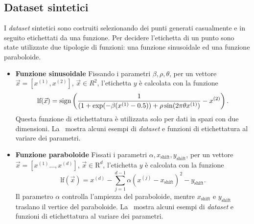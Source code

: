 \subsection{Dataset sintetici}
I \emph{dataset} sintetici sono costruiti selezionando dei punti generati casualmente e in seguito etichettati da una funzione.
Per decidere l'etichetta di un punto sono state utilizzate due tipologie di funzioni: una funzione sinusoidale ed una funzione paraboloide.
\begin{itemize}
    \item \textbf{Funzione sinusoidale} Fissando i parametri $\beta,\rho,\theta$, per un vettore $\Vec{x}=[x^{(1)},x^{(2)}]$, $\Vec{x} \in R^2$, l'etichetta $y$ è calcolata con la funzione
    \begin{equation}\label{eq:sinusoid_dataset_lf}
    \textrm{lf}(\Vec{x}) = \mathrm{sign}\left(\frac{1}{(1 + \exp(-\beta(x^{(1)} - 0.5)) + \rho \sin(2\pi\theta x^{(1)})} - x^{(2)}\right).
    \end{equation}
    Questa funzione di etichettatura è utilizzata solo per dati in spazi con due dimensioni. La~ mostra alcuni esempi di \emph{dataset} e funzioni di etichettatura al variare dei parametri.

    \item \textbf{Funzione paraboloide} Fissati i parametri $\alpha, x_\text{shift}, y_\text{shift}$, per un vettore $\Vec{x}=[x^{(1)}\dots, x^{(d)}]$, $\Vec{x} \in \mathrm{R}^d$, l'etichetta $y$ è calcolata con la funzione
    \begin{equation}\label{eq:pacman_dataset_lf}
    \textrm{lf}(\Vec{x})= x^{(d)} - \sum_{j=1}^{d-1}\alpha(x^{(j)} - x_\text{shift})^2 - y_\text{shift}.
    \end{equation}
    Il parametro $\alpha$ controlla l'ampiezza del paraboloide, mentre $x_\text{shift}$ e $y_\text{shift}$ traslano il vertice del paraboloide.
    La~ mostra alcuni esempi di \emph{dataset} e funzioni di etichettatura al variare dei parametri.
\end{itemize}
